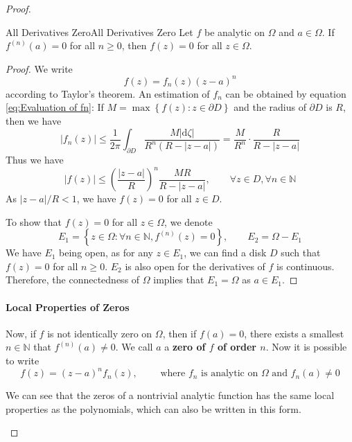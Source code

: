 \documentclass[../main.tex]{subfiles}
\begin{document}
\begin{proof}
\begin{theorem}{All Derivatives Zero}{All Derivatives Zero}
	Let $f$ be analytic on $\Omega$ and $a\in \Omega$. If $f^{(n)}(a) = 0$ for all $n\geq 0$, then $f(z) = 0$ for all $z\in \Omega$.
\end{theorem}
\begin{proof}
We write
\begin{equation*}
f(z) = f_n(z) (z-a)^n
\end{equation*}
according to Taylor's theorem. An estimation of $f_n$ can be obtained by equation \ref{eq:Evaluation of fn}: If $M = \max \left\{ f(z): z\in \partial D \right\}$ and the radius of $\partial D$ is $R$, then we have
\begin{equation*}
	\left|f_n(z)\right| \leq \frac{1}{2 \pi }\int_{\partial D} \frac{M \left|\mathrm{d} \zeta\right|}{R^n(R-\left|z-a\right|)} = \frac{M}{R^n} \cdot \frac{R}{R-\left|z-a\right|}
\end{equation*}
Thus we have
\begin{equation*}
\left|f(z)\right| \leq \left(\frac{\left|z-a\right|}{R}\right)^n \frac{MR}{R-\left|z-a\right|}, \qquad \forall z\in D, \forall n\in \mathbb{N}
\end{equation*}
As $\left|z-a\right| / R < 1$, we have $f(z) = 0$ for all $z\in D$.

To show that $f(z)=0$ for all $z\in \Omega$, we denote
\begin{equation*}
E_1 = \left\{ z\in \Omega: \forall n\in \mathbb{N}, f^{(n)}(z) = 0 \right\}, \qquad E_2=\Omega-E_1
\end{equation*}
We have $E_1$ being open, as for any $z\in E_1$, we can find a disk $D$ such that $f(z) = 0$ for all $n\geq 0$. $E_2$ is also open for the derivatives of $f$ is continuous. Therefore, the connectedness of $\Omega$ implies that $E_1 = \Omega$ as $a\in E_1$.
\end{proof}

\paragraph{Local Properties of Zeros}

Now, if $f$ is not identically zero on $\Omega$, then if $f(a) = 0$, there exists a smallest $n\in \mathbb{N}$ that $f^{(n)}(a) \neq 0$. We call $a$ a \textbf{zero of $f$ of order $n$}. Now it is possible to write
\begin{equation}
	f(z) = (z-a)^n f_n(z), \qquad \text{ where } f_n \text{ is analytic on } \Omega \text{ and } f_n(a) \neq 0
\end{equation}
\begin{remark}
We can see that the zeros of a nontrivial analytic function has the same local properties as the polynomials, which can also be written in this form.
\end{remark}


\end{proof}
\end{document}
